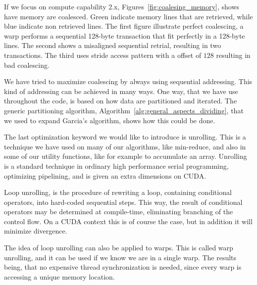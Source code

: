 If we focus on compute capability 2.x, Figures~\ref{fig:coalesing_memory}, shows have memory are coalesced. Green indicate memory lines that are retrieved, while blue indicate non retrieved lines. The first figure illustrate perfect coalescing, a warp performs a sequential 128-byte transaction that fit perfectly in a 128-byte lines. The second shows a misaligned sequential retrial, resulting in two transactions. The third uses stride access pattern with a offset of $128$ resulting in bad coalescing.

We have tried to maximize coalescing by always using sequential addressing. This kind of addressing can be achieved in many ways. One way, that we have use throughout the code, is based on how data are partitioned and iterated. The generic partitioning algorithm, Algorithm~\ref{alg:general_aspects_dividing}, that we used to expand Garcia's algorithm, shows how this could be done.     


The last optimization keyword we would like to introduce is unrolling. This is a technique we have used on many of our algorithms, like min-reduce, and also in some of our utility functions, like for example to accumulate an array. Unrolling is a standard technique in ordinary high performance serial programming, optimizing pipelining, and is given an extra dimensions on CUDA\@. 

Loop unrolling, is the procedure of rewriting a loop, containing conditional operators, into hard-coded sequential steps. This way, the result of conditional operators may be determined at compile-time, eliminating branching of the control flow. On a CUDA context this is of course the case, but in addition it will minimize divergence.

The idea of loop unrolling can also be applied to warps. This is called warp unrolling, and it can be used if we know we are in a single warp. The results being, that no expensive thread synchronization is needed, since every warp is accessing a unique memory location.



\cleardoublepage
